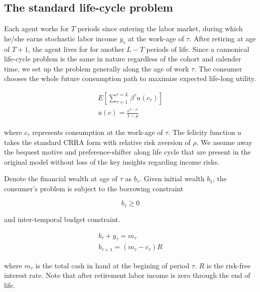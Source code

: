 \documentclass[12pt,notitlepage,onecolumn,aps,pra]{article}
\begin{document}
\hypertarget{the-standard-life-cycle-problem}{%
\subsection{The standard life-cycle
problem}\label{the-standard-life-cycle-problem}}

Each agent works for \(T\) periods since entering the labor market,
during which he/she earns stochastic labor income \(y_\tau\) at the
work-age of \(\tau\). After retiring at age of \(T+1\), the agent lives
for for another \(L-T\) periods of life. Since a cannonical life-cycle
problem is the same in nature regardless of the cohort and calender
time, we set up the problem generally along the age of work \(\tau\).
The consumer chooses the whole future consumption path to maximize
expected life-long utility.

\begin{equation}
\begin{split}
E\left[\sum^{\tau=L}_{\tau=1}\beta^\tau u(c_{\tau})\right] \\
u(c) = \frac{c^{1-\rho}}{1-\rho}
\end{split}
\end{equation}

where \(c_\tau\) represents consumption at the work-age of \(\tau\). The
felicity function \(u\) takes the standard CRRA form with relative risk
aversion of \(\rho\). We assume away the bequest motive and
preference-shifter along life cycle that are present in the original
model without loss of the key insights regarding income risks.

Denote the financial wealth at age of \(\tau\) as \(b_{\tau}\). Given
initial wealth \(b_1\), the consumer's problem is subject to the
borrowing constraint

\begin{equation}
b_{\tau}\geq 0
\end{equation}

and inter-temporal budget constraint.

\begin{equation}
\begin{split}
b_{\tau}+y_{\tau} = m_\tau   \\
b_{\tau+1} = (m_\tau-c_{\tau})R
\end{split}
\end{equation}

where \(m_\tau\) is the total cash in hand at the begining of period
\(\tau\). \(R\) is the risk-free interest rate. Note that after
retirement labor income is zero through the end of life.
\end{document}
